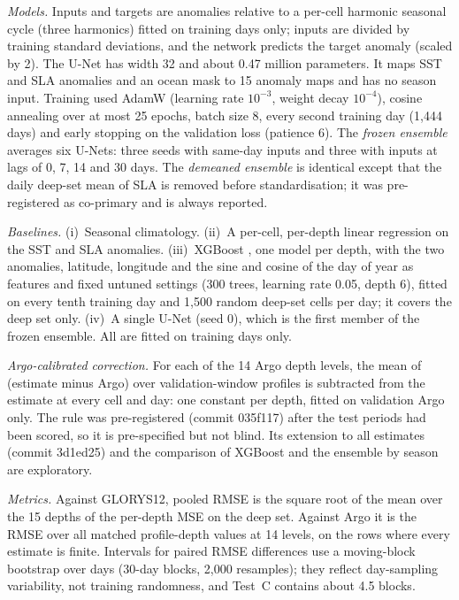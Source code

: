 \emph{Models.} Inputs and targets are anomalies relative to a per-cell harmonic seasonal cycle (three harmonics) fitted on training days only; inputs are divided by training standard deviations, and the network predicts the target anomaly (scaled by 2). The U-Net \cite{unet} has width 32 and about 0.47 million parameters. It maps SST and SLA anomalies and an ocean mask to 15 anomaly maps and has no season input. Training used AdamW (learning rate $10^{-3}$, weight decay $10^{-4}$), cosine annealing over at most 25 epochs, batch size 8, every second training day (1,444 days) and early stopping on the validation loss (patience 6). The \emph{frozen ensemble} averages six U-Nets: three seeds with same-day inputs and three with inputs at lags of 0, 7, 14 and 30 days. The \emph{demeaned ensemble} is identical except that the daily deep-set mean of SLA is removed before standardisation; it was pre-registered as co-primary and is always reported.

\emph{Baselines.} (i)~Seasonal climatology. (ii)~A per-cell, per-depth linear regression on the SST and SLA anomalies. (iii)~XGBoost \cite{xgboost}, one model per depth, with the two anomalies, latitude, longitude and the sine and cosine of the day of year as features and fixed untuned settings (300 trees, learning rate 0.05, depth 6), fitted on every tenth training day and 1,500 random deep-set cells per day; it covers the deep set only. (iv)~A single U-Net (seed 0), which is the first member of the frozen ensemble. All are fitted on training days only.

\emph{Argo-calibrated correction.} For each of the 14 Argo depth levels, the mean of (estimate minus Argo) over validation-window profiles is subtracted from the estimate at every cell and day: one constant per depth, fitted on validation Argo only. The rule was pre-registered (commit 035f117) after the test periods had been scored, so it is pre-specified but not blind. Its extension to all estimates (commit 3d1ed25) and the comparison of XGBoost and the ensemble by season are exploratory.

\emph{Metrics.} Against GLORYS12, pooled RMSE is the square root of the mean over the 15 depths of the per-depth MSE on the deep set. Against Argo it is the RMSE over all matched profile-depth values at 14 levels, on the rows where every estimate is finite. Intervals for paired RMSE differences use a moving-block bootstrap over days (30-day blocks, 2,000 resamples); they reflect day-sampling variability, not training randomness, and Test~C contains about 4.5 blocks.
